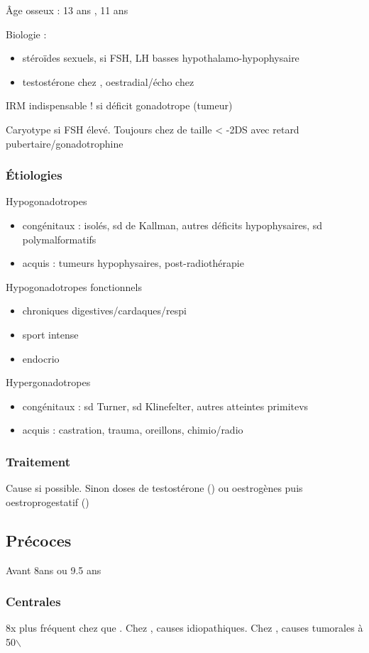 \documentclass[11pt]{article}
\begin{document}
Âge osseux : 13 ans \male, 11 ans \female

Biologie : 
\begin{itemize}
\item stéroïdes sexuels, si FSH, LH basses \thus hypothalamo-hypophysaire
\item testostérone chez \male, oestradial/écho chez \female
\end{itemize}

IRM indispensable ! si déficit gonadotrope (tumeur)

Caryotype si FSH élevé. Toujours chez \female de taille < -2DS avec retard
pubertaire/gonadotrophine \inc

\subsubsection{Étiologies}
\label{sec:org0868d92}
Hypogonadotropes
\begin{itemize}
\item congénitaux : isolés, sd de Kallman, autres déficits hypophysaires, sd
polymalformatifs
\item acquis : tumeurs hypophysaires, post-radiothérapie
\end{itemize}
Hypogonadotropes fonctionnels
\begin{itemize}
\item chroniques digestives/cardaques/respi
\item sport intense
\item endocrio
\end{itemize}
Hypergonadotropes
\begin{itemize}
\item congénitaux : sd Turner, sd Klinefelter, autres atteintes primitevs
\item acquis : castration, trauma, oreillons, chimio/radio
\end{itemize}

\subsubsection{Traitement}
\label{sec:org4283959}
Cause si possible. Sinon doses \inc de testostérone (\male) ou oestrogènes puis
oestroprogestatif (\female)
\subsection{Précoces}
\label{sec:org09bd57e}
Avant 8ans \female ou 9.5 ans \male
\subsubsection{Centrales}
\label{sec:org7d1eb97}
8x plus fréquent chez \female que \male. Chez \female, causes
idiopathiques. Chez \male, causes tumorales à 50$\backslash$%
\end{document}
